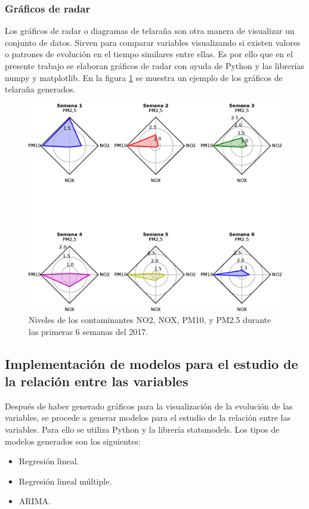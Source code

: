 \subsubsection{Gráficos de radar}
Los gráficos de radar o diagramas de telaraña son otra manera de visualizar un conjunto de datos. Sirven para comparar variables visualizando si existen valores o patrones de evolución en el tiempo similares entre ellas. Es por ello que en el presente trabajo se elaboran gráficos de radar con ayuda de Python y las librerías numpy y matplotlib. En la figura \ref{grafico_de_telaraña} se muestra un ejemplo de los gráficos de telaraña generados.
\begin{figure}[h!]
\setcounter{figure}{1} %
\captionsetup{type=figure} %
\begin{center}
   \includegraphics[width=1\textwidth]{Contaminantes-2017.eps}
   \end{center}
    \caption{Niveles de los contaminantes NO2, NOX, PM10, y PM2.5 durante las primeras 6 semanas del 2017.}
    \label{grafico_de_telaraña}
\end{figure}
\clearpage

\subsection{Implementación de modelos para el estudio de la relación entre las variables}
Después de haber generado gráficos para la visualización de la evolución de las variables, se procede a generar modelos para el estudio de la relación entre las variables. Para ello se utiliza Python y la librería statsmodels. Los tipos de modelos generados son los siguientes:
\begin{itemize}
	\item Regresión lineal.
	\item Regresión lineal múltiple.
	\item ARIMA.
\end{itemize}
\clearpage


